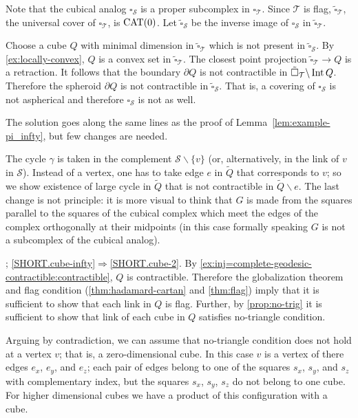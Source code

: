 Note that the cubical analog $\square_{\mathcal{S}}$ is a proper subcomplex in $\square_{\mathcal{T}}$.
Since $\mathcal{T}$ is flag,
$\tilde\square_{\mathcal{T}}$,
the universal cover of $\square_{\mathcal{T}}$, is $\mathrm{CAT}(0)$.
Let $\tilde\square_{\mathcal{S}}$ be the inverse image of $\square_{\mathcal{S}}$ in $\tilde\square_{\mathcal{T}}$.

Choose a cube $Q$ with minimal dimension in $\tilde\square_{\mathcal{T}}$ which is not present in $\tilde\square_{\mathcal{S}}$.
By \ref{ex:locally-convex}, $Q$ is a convex set in $\tilde\square_{\mathcal{T}}$.
The closest point projection $\tilde\square_{\mathcal{T}}\to Q$ is a retraction.
It follows that the boundary $\partial Q$ is not contractible in $\tilde\square_{\mathcal{T}}\backslash\operatorname{\rm Int}\nolimits Q$.
Therefore the spheroid $\partial Q$ is not contractible in $\tilde\square_{\mathcal{S}}$.
That is, a covering of $\square_{\mathcal{S}}$ is not aspherical and therefore $\square_{\mathcal{S}}$ is not as well.

The solution goes along the same lines as the proof of Lemma~\ref{lem:example-pi_infty}, but few changes are needed.

The cycle $\gamma$ is taken in the complement $\mathcal{S}\backslash\{v\}$ (or, alternatively, in the link of $v$ in $\mathcal{S}$).
Instead of a vertex, one has to take edge $e$ in $\tilde Q$ that corresponds to $v$; so we show existence of large cycle in $\tilde Q$ that is not contractible in $\tilde Q\backslash e$.
The last change is not principle:
it is more visual to think that $G$ is made from the squares parallel to the squares of the cubical complex which meet the edges of the complex orthogonally at their midpoints (in this case formally speaking $G$ is not a subcomplex of the cubical analog).

\parbf{\ref{ex:cube-infty=>cube-2}}; \ref{SHORT.cube-infty}$\Rightarrow$\ref{SHORT.cube-2}.
By \ref{ex:inj=complete-geodesic-contractible:contractible}, $Q$ is contractible.
Therefore the globalization theorem and flag condition (\ref{thm:hadamard-cartan} and \ref{thm:flag}) imply that it is sufficient to show that each link in $Q$ is flag.
Further, by \ref{prop:no-trig} it is sufficient to show that link of each cube in $Q$ satisfies no-triangle condition.

Arguing by contradiction, we can assume that no-triangle condition does not hold at a vertex $v$; that is, a zero-dimensional cube.
In this case $v$ is a vertex of there edges $e_x$, $e_y$, and $e_z$;
each pair of edges belong to one of the squares $s_x$, $s_y$, and $s_z$ with complementary index, but the squares $s_x$, $s_y$, $s_z$ do not belong to one cube.
For higher dimensional cubes we have a product of this configuration with a cube.

